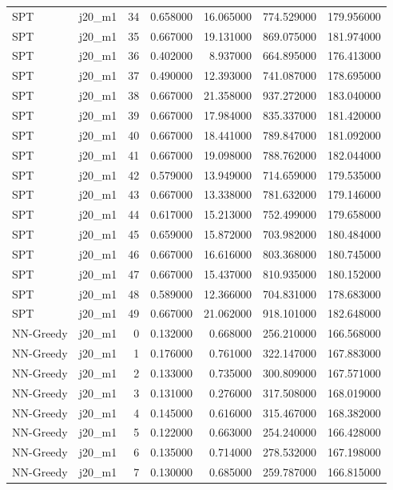 \begin{tabular}{llrrrrr}
SPT & j20_m1 & 34 & 0.658000 & 16.065000 & 774.529000 & 179.956000 \\
SPT & j20_m1 & 35 & 0.667000 & 19.131000 & 869.075000 & 181.974000 \\
SPT & j20_m1 & 36 & 0.402000 & 8.937000 & 664.895000 & 176.413000 \\
SPT & j20_m1 & 37 & 0.490000 & 12.393000 & 741.087000 & 178.695000 \\
SPT & j20_m1 & 38 & 0.667000 & 21.358000 & 937.272000 & 183.040000 \\
SPT & j20_m1 & 39 & 0.667000 & 17.984000 & 835.337000 & 181.420000 \\
SPT & j20_m1 & 40 & 0.667000 & 18.441000 & 789.847000 & 181.092000 \\
SPT & j20_m1 & 41 & 0.667000 & 19.098000 & 788.762000 & 182.044000 \\
SPT & j20_m1 & 42 & 0.579000 & 13.949000 & 714.659000 & 179.535000 \\
SPT & j20_m1 & 43 & 0.667000 & 13.338000 & 781.632000 & 179.146000 \\
SPT & j20_m1 & 44 & 0.617000 & 15.213000 & 752.499000 & 179.658000 \\
SPT & j20_m1 & 45 & 0.659000 & 15.872000 & 703.982000 & 180.484000 \\
SPT & j20_m1 & 46 & 0.667000 & 16.616000 & 803.368000 & 180.745000 \\
SPT & j20_m1 & 47 & 0.667000 & 15.437000 & 810.935000 & 180.152000 \\
SPT & j20_m1 & 48 & 0.589000 & 12.366000 & 704.831000 & 178.683000 \\
SPT & j20_m1 & 49 & 0.667000 & 21.062000 & 918.101000 & 182.648000 \\
NN-Greedy & j20_m1 & 0 & 0.132000 & 0.668000 & 256.210000 & 166.568000 \\
NN-Greedy & j20_m1 & 1 & 0.176000 & 0.761000 & 322.147000 & 167.883000 \\
NN-Greedy & j20_m1 & 2 & 0.133000 & 0.735000 & 300.809000 & 167.571000 \\
NN-Greedy & j20_m1 & 3 & 0.131000 & 0.276000 & 317.508000 & 168.019000 \\
NN-Greedy & j20_m1 & 4 & 0.145000 & 0.616000 & 315.467000 & 168.382000 \\
NN-Greedy & j20_m1 & 5 & 0.122000 & 0.663000 & 254.240000 & 166.428000 \\
NN-Greedy & j20_m1 & 6 & 0.135000 & 0.714000 & 278.532000 & 167.198000 \\
NN-Greedy & j20_m1 & 7 & 0.130000 & 0.685000 & 259.787000 & 166.815000 \\

\end{tabular}
